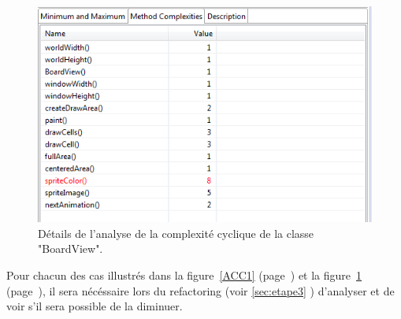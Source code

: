 \documentclass[12pt,a4paper,final]{article}
\newcommand{\labelfigure}[1]{figure~\ref{#1} (page~\pageref{#1})}
\begin{document}
\begin{figure}[!h]
	\centering
	\includegraphics[width=\textwidth]{ACC_BoardView.png}
	\caption{\label{ACC2}Détails de l'analyse de la complexité cyclique de la classe "BoardView".}
\end{figure}
Pour chacun des cas illustrés dans la \labelfigure{ACC1} et la \labelfigure{ACC2}, il sera nécéssaire lors du refactoring (voir \ref{sec:etape3} ) d'analyser et de voir s'il sera possible de la diminuer.
\end{document}
